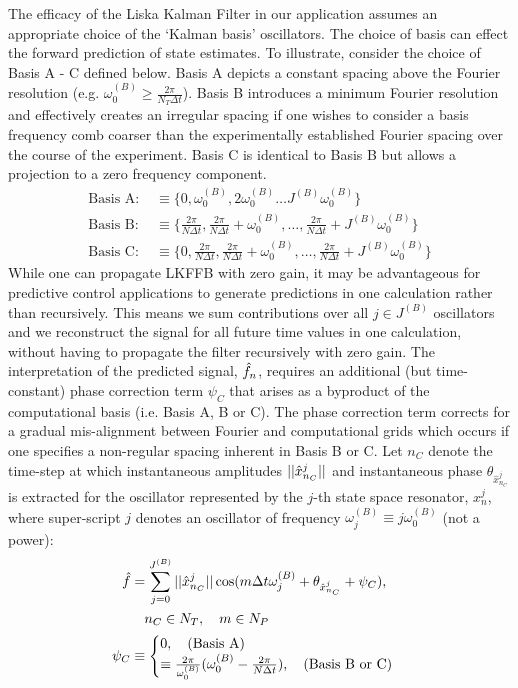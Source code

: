 The efficacy of the Liska Kalman Filter in our application assumes an appropriate choice of the `Kalman basis' oscillators. The choice of basis can effect the forward prediction of state estimates. To illustrate, consider the choice of Basis A - C defined below. Basis A depicts a constant spacing above the Fourier resolution (e.g. $\omega_0^{(B)} \geq \frac{2\pi}{N_T \Delta t}$). Basis B  introduces a minimum Fourier resolution and effectively creates an irregular spacing if one wishes to consider a basis frequency comb coarser than the experimentally established Fourier spacing over the course of the experiment. Basis C is identical to Basis B but allows a projection to a zero frequency component. 
 \begin{align}
 \text{Basis A: } & \equiv \{0, \omega_0^{(B)}, 2\omega_0^{(B)} \dots  J^{(B)} \omega_0^{(B)} \} \\
 \text{Basis B: } & \equiv \{ \frac{2\pi}{N \Delta t}, \frac{2\pi}{N \Delta t} + \omega_0^{(B)} , \dots,   \frac{2\pi}{N \Delta t} + J^{(B)} \omega_0^{(B)} \} \\
 \text{Basis C: } & \equiv \{ 0, \frac{2\pi}{N \Delta t}, \frac{2\pi}{N \Delta t} + \omega_0^{(B)},  \dots,   \frac{2\pi}{N \Delta t} + J^{(B)} \omega_0^{(B)} \} 
 \end{align}
 While one can propagate LKFFB with zero gain, it may be advantageous for predictive control applications to generate predictions in one calculation rather than recursively. This means we sum contributions over all $j\in J^{(B)}$ oscillators and we reconstruct the signal for all future time values in one calculation, without having to propagate the filter recursively with zero gain. The interpretation of the predicted signal, $\hat{f}_n$, requires an additional (but time-constant) phase correction term $\psi_C$ that arises as a byproduct of the computational basis (i.e. Basis A, B or C).  The phase correction term corrects for a gradual mis-alignment between Fourier and computational grids which occurs if one specifies a non-regular spacing inherent in Basis B or C. Let $n_C$ denote the time-step at which instantaneous amplitudes $||\hat{x}^j_{n_C}||$ and instantaneous phase $\theta_{\hat{x}^j_{n_C}}$ is extracted for the oscillator represented by the $j$-th state space resonator, $x^j_n $, where super-script $j$ denotes an oscillator of  frequency $\omega_j^{(B)} \equiv j\omega_0^{(B)}$ (not a power):
 \begin{align}
 \hat{f} &= \sum_{j=0}^{J^{(B)}}||\hat{x}^j_{n_C}|| \cos(m\Delta t \omega_j^{(B)} + \theta_{\hat{x}^j_{n_C}} + \psi_C), \\
 & \quad  n_C \in N_T, \quad m \in N_P \nonumber \\
 \psi_C & \equiv \begin{cases}
 0,  \quad \text{(Basis A)} \\
 \equiv  \frac{2\pi}{\omega_0^{(B)} } (\omega_0^{(B)} - \frac{2\pi}{N \Delta t}), \quad \text{(Basis B or C)} \\
 \end{cases}
 \end{align}
